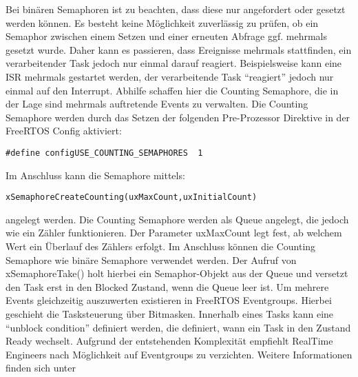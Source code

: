 Bei binären Semaphoren ist zu beachten, dass diese nur angefordert oder gesetzt werden können. Es besteht keine Mög\-lich\-keit zuverlässig zu prüfen, ob ein Semaphor zwischen einem Setzen und einer erneuten Abfrage ggf. mehrmals gesetzt wurde. Daher kann es passieren, dass Ereignisse mehrmals stattfinden, ein verarbeitender Task jedoch nur einmal darauf reagiert. Beispielsweise kann eine ISR mehrmals gestartet werden, der verarbeitende Task "`reagiert"' jedoch nur einmal auf den Interrupt.
Abhilfe schaffen hier die Counting Semaphore, die in der Lage sind mehrmals auftretende Events zu verwalten. Die Counting Semaphore werden durch das Setzen der folgenden Pre-Prozessor Direktive in der FreeRTOS Config aktiviert:
\begin{lstlisting}[numbers = none]
#define configUSE_COUNTING_SEMAPHORES  1
\end{lstlisting}
Im Anschluss kann die Semaphore mittels:
\begin{lstlisting}[numbers = none]
xSemaphoreCreateCounting(uxMaxCount,uxInitialCount) 
\end{lstlisting}
angelegt werden. Die Counting Semaphore werden als Que\-ue angelegt, die jedoch wie ein Zähler funktionieren. Der Parameter uxMaxCount legt fest, ab welchem Wert ein Überlauf des Zählers erfolgt. 
Im Anschluss kön\-nen die Counting Semaphore wie binäre Semaphore verwendet werden. Der Aufruf von xSemaphoreTake() holt hierbei ein Semaphor-Objekt aus der Queue und versetzt den Task erst in den Blocked Zustand, wenn die Queue leer ist\cite[p.191ff]{MasteringFreeRtos}.
Um mehrere Events gleichzeitig auszuwerten existieren in FreeRTOS Eventgroups. Hierbei geschieht die Tasksteuerung über Bitmasken. Innerhalb eines Tasks kann eine "`unblock condition"' definiert werden, die definiert, wann ein Task in den Zustand Ready wechselt. Aufgrund der entstehenden Komplexität empfiehlt RealTime Engineers nach Mög\-lich\-keit auf Eventgroups zu verzichten. Weitere Informationen finden sich unter \cite[p.265ff]{MasteringFreeRtos} 
